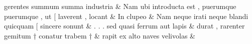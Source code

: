 \documentclass[12pt,onecolumn,twoside,a4paper]{memoir}
\begin{document}
\begin{pairs}
\begin{Leftside}
                              gerentes
                              summum
                              summa
                              industria \&
                         \stanza {}Nam
                              ubi
                              introducta
                              est
                              ,
                              puerumque
                              {puerumque}
                              ,
                              ut
                              [
                              laverent
                              ,
                              locant & 
                     In
                              clupeo \&
                         \stanza {}
                     Nam
                              neque
                              irati
                              neque
                              blandi
                              quicquam
                              [
                              sincere
                              sonunt \&
                         \stanza {}.
                              .
                              .
                              sed
                              quasi
                              ferrum
                              aut
                              lapis & 
                     durat
                              ,
                              rarenter
                              gemitum
                              †
                              conatur
                              trabem
                              † \&
                         \stanza {}
                     rapit
                              ex
                              alto
                              naves
                              velivolas \&
                     
                  \endnumbering
		\end{Leftside}
                  \begin{Rightside}
			\beginnumbering
			\numberstanzafalse
                     

\end{Rightside}
\end{pairs}
\end{document}
